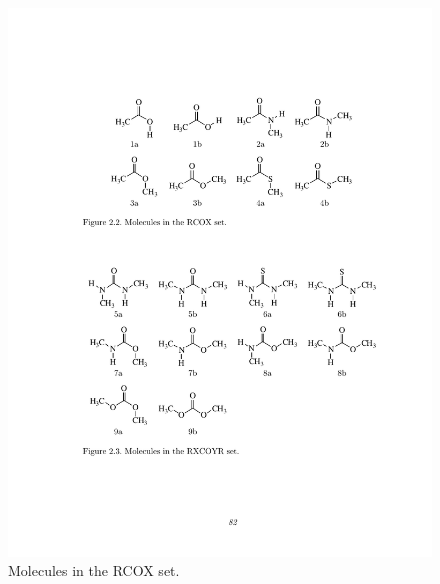 \documentclass[12pt]{report}
\begin{document}
\begin{figure}[ht]
\centering
\includegraphics[scale=0.87]{figures/pdf/rcoxset.pdf}
\caption{Molecules in the RCOX set.}
\label{rcox}
\end{figure}
\end{document}
